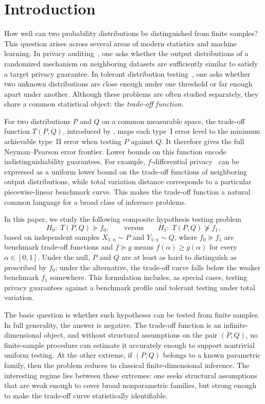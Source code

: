 \documentclass[english]{article}
\theoremstyle{plain}
\theoremstyle{definition}
\newcommand{\Toff}[2]{T(#1,#2)}
\newcommand{\fnull}{f_0}
\newcommand{\falt}{f_1}
\begin{document}
\section{Introduction}\label{sec:intro}

How well can two probability distributions be distinguished from finite samples?
This question arises across several areas of modern statistics and machine learning. In privacy auditing~\cite{Auditing3, Auditing2}, one asks whether the output distributions of a randomized mechanism on neighboring datasets are sufficiently similar to satisfy a target privacy guarantee. In tolerant distribution testing~\cite{price2021tolerant}, one asks whether two unknown distributions are close enough under one threshold or far enough apart under another. Although these problems are often studied separately, they share a common statistical object: the \emph{trade-off function}.

For two distributions $P$ and $Q$ on a common measurable space, the trade-off function $\Toff{P}{Q}$, introduced by \cite{GDP}, maps each type~I error level to the minimum achievable type~II error when testing $P$ against $Q$. It therefore
gives the full Neyman--Pearson error frontier. Lower bounds on this function
encode indistinguishability guarantees. For example, \(f\)-differential
privacy~\cite{GDP} can be expressed as a uniform lower bound on the trade-off
functions of neighboring output distributions, while total variation distance
corresponds to a particular piecewise-linear benchmark curve. This makes the trade-off function a natural common language for a broad class of inference problems.

In this paper, we study the following composite hypothesis testing problem
\[
H_0:\; \Toff{P}{Q}\succeq \fnull,
\qquad\text{versus}\qquad
H_1:\; \Toff{P}{Q}\not\succeq \falt,
\]
based on independent samples $X_{1:n}\sim P$ and $Y_{1:n}\sim Q$, where $\fnull\succeq \falt$ are benchmark trade-off functions  and
\(f\succeq g\) means \(f(\alpha)\geqslant g(\alpha)\) for every
\(\alpha\in[0,1]\). Under the null, $P$ and $Q$ are at least as hard to distinguish as prescribed by $\fnull$; under the alternative, the trade-off curve falls below the weaker benchmark $\falt$ somewhere. This formulation includes, as special cases, testing privacy guarantees
against a benchmark profile and tolerant testing under total variation.

The basic question is whether such hypotheses can be tested from finite samples. In full generality, the answer is negative. The trade-off function is an infinite-dimensional object, and without structural assumptions on the pair $(P,Q)$, no finite-sample procedure can estimate it accurately enough to support nontrivial uniform testing. At the other extreme, if $(P,Q)$ belongs to a known parametric family, then the problem reduces to classical finite-dimensional inference. The interesting regime lies between these extremes: one seeks structural assumptions that are weak enough to cover broad nonparametric families, but strong enough to make the trade-off curve statistically identifiable.
\end{document}
